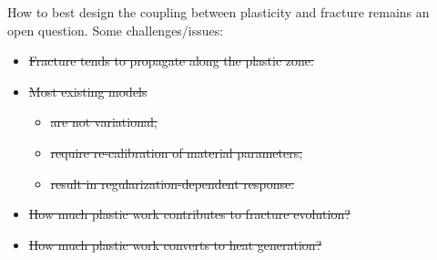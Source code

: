 \begin{frame}
  \begin{columns}[T]
    \begin{column}{0.7\textwidth}
      \vspace{3em}
      How to best design the coupling between plasticity and fracture remains an open question. Some challenges/issues:
      \begin{itemize}
        \item \sout<2->{Fracture tends to propagate along the plastic zone.}
        \item \sout<7->{Most existing models}
              \begin{itemize}
                \item \sout<3->{are not variational,}
                \item \sout<5->{require re-calibration of material parameters,}
                \item \sout<7->{result in regularization-dependent response.}
              \end{itemize}
        \item \sout<8->{How much plastic work contributes to fracture evolution?}
        \item \sout<8->{How much plastic work converts to heat generation?}
      \end{itemize}
    \end{column}
    \begin{column}{0.3\textwidth}
      \vspace{-1.5em}
      \only<4>{
        
      }
    \end{column}
  \end{columns}
\end{frame}

